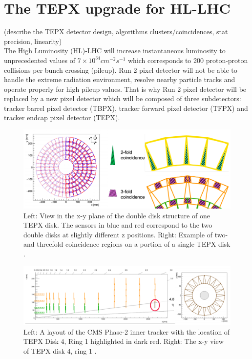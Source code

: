 \section{The TEPX upgrade for HL-LHC}
\label{sec:tepx}
(describe the TEPX detector design, algorithms clusters/coincidences, stat precision, linearity)\\

The High Luminosity (HL)-LHC will increase instantaneous luminosity to unprecedented values of $7 \times 10^{34} cm^{-2} s^{-1}$ which corresponds to 200 proton-proton collisions per bunch crossing (pileup). Run 2 pixel detector will not be able to handle the extreme radiation environment, resolve nearby particle tracks and operate properly for high pileup values. That is why Run 2 pixel detector will be replaced by a new pixel detector which will be composed of three subdetectors: tracker barrel pixel detector (TBPX), tracker forward pixel detector (TFPX) and tracker endcap pixel detector (TEPX).

\begin{figure}[H]
  \centering
  \includegraphics[width=0.6\columnwidth]{./up.png}
  \caption{\onehalfspacing Left: View in the x-y plane of the double disk structure of one TEPX disk. The sensors in blue and red correspond to the two double disks at slightly different z positions. Right: Example of two- and threefold coincidence regions on a portion of a single TEPX disk \cite{}.}
  \label{fig:CMS}
\end{figure}


\begin{figure}[H]
  \centering
  \includegraphics[width=0.6\columnwidth]{./up1.png}
  \caption{ \onehalfspacing Left: A layout of the CMS Phase-2 inner tracker with the location of TEPX Disk 4, Ring 1 highlighted in dark red. Right: The x-y view of TEPX disk 4, ring 1 \cite{}.}
  \label{fig:CMS}
\end{figure}


